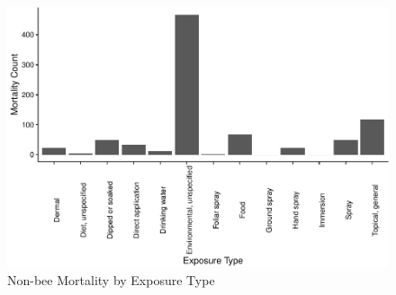 \documentclass[
  12pt,
]{article}
\begin{document}
\begin{figure}
\centering
\includegraphics{SamEdit_UpdatedwithModel_files/figure-latex/unnamed-chunk-8-1.pdf}
\caption{Non-bee Mortality by Exposure Type}
\end{figure}
\end{document}
